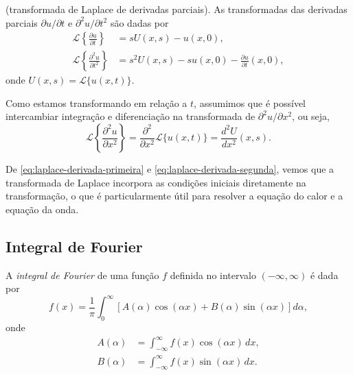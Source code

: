 \documentclass{article}
\begin{document}
\begin{prop} (transformada de Laplace de derivadas parciais).
    As transformadas das derivadas parciais \(\partial u/\partial t\) e \(\partial^2 u/\partial t^2\) são dadas por
    \begin{align}
        \mathcal{L}\left\{\frac{\partial u}{\partial t}\right\} &= s U(x,s) - u(x,0), \label{eq:laplace-derivada-primeira} \\
        \mathcal{L}\left\{\frac{\partial^2 u}{\partial t^2}\right\} &= s^2 U(x,s) - s u(x,0) - \frac{\partial u}{\partial t}(x,0), \label{eq:laplace-derivada-segunda}
    \end{align}
    \noindent onde \(U(x,s) = \mathcal{L}\{u(x,t)\}\).

    Como estamos transformando em relação a \(t\), assumimos que é possível intercambiar integração e diferenciação na transformada de \(\partial^2u/\partial x^2\), ou seja,
    \begin{equation}
        \mathcal{L}\left\{\frac{\partial^2 u}{\partial x^2}\right\} = \frac{\partial^2}{\partial x^2} \mathcal{L}\{u(x,t)\} = \frac{d^2 U}{d x^2}(x,s).
    \end{equation}
\end{prop}

\begin{rem}
    De \eqref{eq:laplace-derivada-primeira} e \eqref{eq:laplace-derivada-segunda}, vemos que a transformada de Laplace incorpora as condições iniciais diretamente na transformação, o que é particularmente útil para resolver a equação do calor e a equação da onda.
\end{rem}

\subsection{Integral de Fourier}

\begin{defn}
    A \emph{integral de Fourier} de uma função \(f\) definida no intervalo \(\left(-\infty, \infty\right)\) é dada por
    \begin{equation}\label{eq:integral-fourier}
        f(x) = \frac{1}{\pi} \int_{0}^{\infty} \left[A(\alpha) \cos(\alpha x) + B(\alpha) \sin(\alpha x)\right] d\alpha,
    \end{equation}
    \noindent onde
    \begin{align}
        A(\alpha) &= \int_{-\infty}^{\infty} f(x) \cos(\alpha x) \, dx, \\
        B(\alpha) &= \int_{-\infty}^{\infty} f(x) \sin(\alpha x) \, dx.
    \end{align}
\end{defn}
\end{document}
